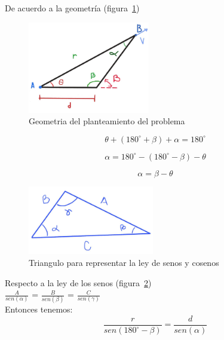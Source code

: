 \documentclass[a4paper,11pt]{scrartcl}
\begin{document}
\begin{center}

De acuerdo a la geometría (figura~\ref{fig:11_2}) \\

\begin{figure}[h!]
  \centering
  \includegraphics[height=4cm]{11_2}
  \caption{Geometria del planteamiento del problema}
  \label{fig:11_2}
\end{figure}

\begin{equation}
\theta + (180^{\circ} + \beta) + \alpha = 180^{\circ}
\end{equation}

\begin{equation}
\alpha = 180^{\circ} - (180^{\circ} - \beta) - \theta
\end{equation}

\begin{equation}
\alpha = \beta - \theta
\end{equation}

\begin{figure}[h!]
  \centering
  \includegraphics[height=3cm]{11_3}
  \caption{Triangulo para representar la ley de senos y cosenos}
  \label{fig:11_3}
\end{figure}

Respecto a la ley de los senos (figura~\ref{fig:11_3})\\
\hfill \break
$\frac{A}{sen(\alpha)}$ = $\frac{B}{sen(\beta)}$ = $\frac{C}{sen(\gamma)}$\\
\hfill \break
Entonces tenemos:\\

\begin{equation}
\frac{r}{sen(180^{\circ} - \beta)} =  \frac{d}{sen(\alpha)}
\end{equation}


\end{center}
\end{document}

